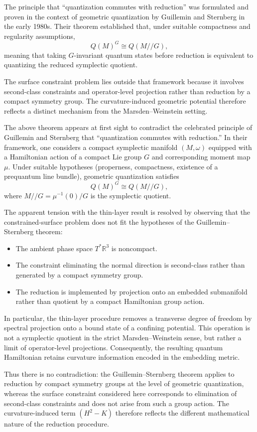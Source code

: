 The principle that ``quantization commutes with reduction'' was formulated 
and proven in the context of geometric quantization by Guillemin and Sternberg 
in the early 1980s. Their theorem established that, under suitable compactness 
and regularity assumptions,
\begin{equation}
Q(M)^G \cong Q(M//G),
\end{equation}
meaning that taking $G$-invariant quantum states before reduction is equivalent 
to quantizing the reduced symplectic quotient.

The surface constraint problem  lies outside that framework because it involves 
second-class constraints and operator-level projection rather than reduction by a 
compact symmetry group. The curvature-induced geometric potential therefore 
reflects a distinct mechanism from the Marsden--Weinstein setting.

The above theorem appears at first sight to contradict the celebrated principle 
of Guillemin and Sternberg that ``quantization commutes with reduction.'' In their 
framework, one considers a compact symplectic manifold $(M,\omega)$ equipped with a 
Hamiltonian action of a compact Lie group $G$ and corresponding moment map $\mu$. 
Under suitable hypotheses (properness, compactness, existence of a prequantum 
line bundle), geometric quantization satisfies
\begin{equation}
Q(M)^G \cong Q(M//G),
\end{equation}
where $M//G = \mu^{-1}(0)/G$ is the symplectic quotient.

The apparent tension with the thin-layer result is resolved by observing that 
the constrained-surface problem does not fit the hypotheses of the 
Guillemin--Sternberg theorem:
\begin{itemize}
\item The ambient phase space $T^*\mathbb{R}^3$ is noncompact.
\item The constraint eliminating the normal direction is second-class rather 
    than generated by a compact symmetry group.
\item The reduction is implemented by projection onto an embedded submanifold 
    rather than quotient by a compact Hamiltonian group action.
\end{itemize}

In particular, the thin-layer procedure removes a transverse degree of freedom 
by spectral projection onto a bound state of a confining potential. This operation
is not a symplectic quotient in the strict Marsden--Weinstein sense, but rather 
a limit of operator-level projections. Consequently, the resulting quantum 
Hamiltonian retains curvature information encoded in the embedding metric.

Thus there is no contradiction: the Guillemin--Sternberg theorem applies to 
reduction by compact symmetry groups at the level of geometric quantization,
whereas the surface constraint considered here corresponds to elimination of 
second-class constraints and does not arise from such a group action. The 
curvature-induced term $(H^2-K)$ therefore reflects the different mathematical 
nature of the reduction procedure.

